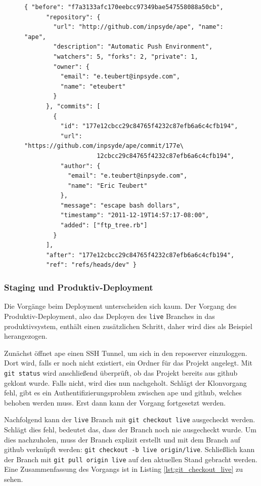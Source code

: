 \begin{figure}
	\begin{lstlisting}[caption=Beispiel-Webhook von \gls{github},label={lst:example_payload}]
	{ "before": "f7a3133afc170eebcc97349bae547558088a50cb",
	  "repository": {
	    "url": "http://github.com/inpsyde/ape", "name": "ape",
	    "description": "Automatic Push Environment",
	    "watchers": 5, "forks": 2, "private": 1,
	    "owner": {
	      "email": "e.teubert@inpsyde.com",
	      "name": "eteubert"
	    }
	  }, "commits": [
	    {
	      "id": "177e12cbcc29c84765f4232c87efb6a6c4cfb194",
	      "url": "https://github.com/inpsyde/ape/commit/177e\
					12cbcc29c84765f4232c87efb6a6c4cfb194",
	      "author": {
	        "email": "e.teubert@inpsyde.com",
	        "name": "Eric Teubert"
	      },
	      "message": "escape bash dollars",
	      "timestamp": "2011-12-19T14:57:17-08:00",
	      "added": ["ftp_tree.rb"]
	    }
	  ],
	  "after": "177e12cbcc29c84765f4232c87efb6a6c4cfb194",
	  "ref": "refs/heads/dev" }
	\end{lstlisting}
	
\end{figure}



\subsubsection{Staging und Produktiv-Deployment} %
\label{ssub:staging_und_produktiv_deployment}

Die Vorgänge beim Deployment unterscheiden sich kaum. Der Vorgang des Produktiv-Deployment, also das Deployen des \lstinline!live! Branches in das \gls{produktivsystem}, enthält einen zusätzlichen Schritt, daher wird dies als Beispiel herangezogen.

Zunächst öffnet \gls{ape} einen SSH Tunnel, um sich in den \gls{reposerver} einzuloggen. Dort wird, falls er noch nicht existiert, ein Ordner für das Projekt angelegt. Mit \lstinline!git status! wird anschließend überprüft, ob das Projekt bereits aus \gls{github} geklont wurde. Falls nicht, wird dies nun nachgeholt. Schlägt der Klonvorgang fehl, gibt es ein Authentifizierungsproblem zwischen \gls{ape} und \gls{github}, welches behoben werden muss. Erst dann kann der Vorgang fortgesetzt werden.

Nachfolgend kann der \lstinline!live! Branch mit \lstinline!git checkout live! ausgecheckt werden. Schlägt dies fehl, bedeutet das, dass der Branch noch nie ausgecheckt wurde. Um dies nachzuholen, muss der Branch explizit erstellt und mit dem Branch auf \gls{github} verknüpft werden: \lstinline!git checkout -b live origin/live!. Schließlich kann der Branch mit \lstinline!git pull origin live! auf den aktuellen Stand gebracht werden. Eine Zusammenfassung des Vorgangs ist in Listing \ref{lst:git_checkout_live} zu sehen.

